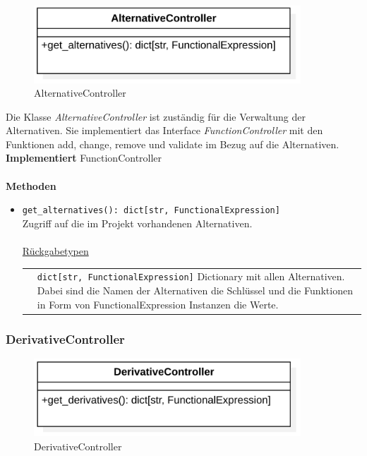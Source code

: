 \documentclass{article}
\begin{document}
\begin{figure}[H]%
    \centering
    \includegraphics[width=10cm]{entwurf/Floriane/AlternativeController.png}
    \caption{AlternativeController}
\end{figure}

Die Klasse \textit{AlternativeController} ist zuständig für die Verwaltung der Alternativen. Sie implementiert das Interface \textit{FunctionController} mit den Funktionen add, change, remove und validate im Bezug auf die Alternativen.
\newline\newline
\textbf{\large{Implementiert}} FunctionController \\\\
\textbf{\large{Methoden}}
\begin{itemize}
\item \texttt{get\_alternatives(): dict[str, FunctionalExpression]}\\ Zugriff auf die im Projekt vorhandenen Alternativen.\\\\
\underline{{Rückgabetypen}}\\
\begin{tabular}{lp{10.7cm}}
 & \texttt{dict[str, FunctionalExpression]}  Dictionary mit allen Alternativen. Dabei sind die Namen der Alternativen die Schlüssel und die Funktionen in Form von FunctionalExpression Instanzen die Werte.\\
\end{tabular}
\end{itemize}


\newpage
\subsubsection*{\large{\textbf{DerivativeController}\label{cls:DerivativeController}}}\normalsize

\begin{figure}[H]%
    \centering
    \includegraphics[width=10cm]{entwurf/Floriane/DerivativeController.png}
    \caption{DerivativeController}
\end{figure}
\end{document}
